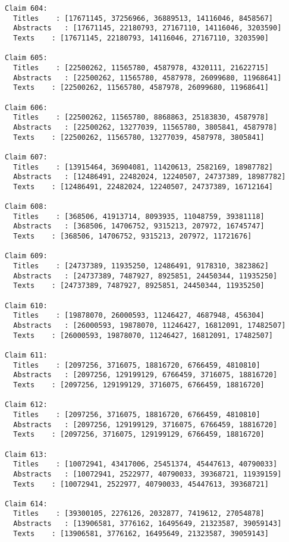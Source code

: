 \documentclass[11pt]{article}
\begin{document}
\begin{Verbatim}[commandchars=\\\{\}]
Claim 604:
  Titles    : [17671145, 37256966, 36889513, 14116046, 8458567]
  Abstracts   : [17671145, 22180793, 27167110, 14116046, 3203590]
  Texts    : [17671145, 22180793, 14116046, 27167110, 3203590]

Claim 605:
  Titles    : [22500262, 11565780, 4587978, 4320111, 21622715]
  Abstracts   : [22500262, 11565780, 4587978, 26099680, 11968641]
  Texts    : [22500262, 11565780, 4587978, 26099680, 11968641]

Claim 606:
  Titles    : [22500262, 11565780, 8868863, 25183830, 4587978]
  Abstracts   : [22500262, 13277039, 11565780, 3805841, 4587978]
  Texts    : [22500262, 11565780, 13277039, 4587978, 3805841]

Claim 607:
  Titles    : [13915464, 36904081, 11420613, 2582169, 18987782]
  Abstracts   : [12486491, 22482024, 12240507, 24737389, 18987782]
  Texts    : [12486491, 22482024, 12240507, 24737389, 16712164]

Claim 608:
  Titles    : [368506, 41913714, 8093935, 11048759, 39381118]
  Abstracts   : [368506, 14706752, 9315213, 207972, 16745747]
  Texts    : [368506, 14706752, 9315213, 207972, 11721676]

Claim 609:
  Titles    : [24737389, 11935250, 12486491, 9178310, 3823862]
  Abstracts   : [24737389, 7487927, 8925851, 24450344, 11935250]
  Texts    : [24737389, 7487927, 8925851, 24450344, 11935250]

Claim 610:
  Titles    : [19878070, 26000593, 11246427, 4687948, 456304]
  Abstracts   : [26000593, 19878070, 11246427, 16812091, 17482507]
  Texts    : [26000593, 19878070, 11246427, 16812091, 17482507]

Claim 611:
  Titles    : [2097256, 3716075, 18816720, 6766459, 4810810]
  Abstracts   : [2097256, 129199129, 6766459, 3716075, 18816720]
  Texts    : [2097256, 129199129, 3716075, 6766459, 18816720]

Claim 612:
  Titles    : [2097256, 3716075, 18816720, 6766459, 4810810]
  Abstracts   : [2097256, 129199129, 3716075, 6766459, 18816720]
  Texts    : [2097256, 3716075, 129199129, 6766459, 18816720]

Claim 613:
  Titles    : [10072941, 43417006, 25451374, 45447613, 40790033]
  Abstracts   : [10072941, 2522977, 40790033, 39368721, 11939159]
  Texts    : [10072941, 2522977, 40790033, 45447613, 39368721]

Claim 614:
  Titles    : [39300105, 2276126, 2032877, 7419612, 27054878]
  Abstracts   : [13906581, 3776162, 16495649, 21323587, 39059143]
  Texts    : [13906581, 3776162, 16495649, 21323587, 39059143]


\end{Verbatim}
\end{document}
